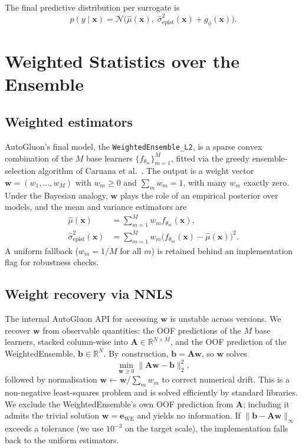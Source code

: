 \documentclass[conference]{IEEEtran}
\begin{document}
The final predictive distribution per surrogate is
\begin{equation}
p(y \mid \bm x) = \mathcal{N}\!\big(\hat\mu(\bm x),\; \hat\sigma^2_{\text{epist}}(\bm x) + g_\phi(\bm x)\big).
\label{eq:predictive-dist}
\end{equation}

\section{Weighted Statistics over the Ensemble}
\label{sec:weights}

\subsection{Weighted estimators}

AutoGluon's final model, the \texttt{WeightedEnsemble\_L2}, is a sparse convex combination of the $M$ base learners $\{f_{\theta_m}\}_{m=1}^M$, fitted via the greedy ensemble-selection algorithm of Caruana et al.~\cite{caruana2004}. The output is a weight vector $\bm w = (w_1, \ldots, w_M)$ with $w_m \geq 0$ and $\sum_m w_m = 1$, with many $w_m$ exactly zero. Under the Bayesian analogy, $\bm w$ plays the role of an empirical posterior over models, and the mean and variance estimators are
\begin{align}
\hat\mu(\bm x) &= \sum_{m=1}^M w_m f_{\theta_m}(\bm x), \label{eq:mu-hat}\\
\hat\sigma^2_{\text{epist}}(\bm x) &= \sum_{m=1}^M w_m \big(f_{\theta_m}(\bm x) - \hat\mu(\bm x)\big)^2. \label{eq:sigma-epist}
\end{align}
A uniform fallback ($w_m = 1/M$ for all $m$) is retained behind an implementation flag for robustness checks.

\subsection{Weight recovery via NNLS}

The internal AutoGluon API for accessing $\bm w$ is unstable across versions. We recover $\bm w$ from observable quantities: the OOF predictions of the $M$ base learners, stacked column-wise into $\mathbf{A} \in \mathbb{R}^{N \times M}$, and the OOF prediction of the WeightedEnsemble, $\bm b \in \mathbb{R}^N$. By construction, $\bm b = \mathbf{A}\bm w$, so $\bm w$ solves
\begin{equation}
\min_{\bm w \geq 0} \|\mathbf{A}\bm w - \bm b\|_2^2,
\label{eq:nnls}
\end{equation}
followed by normalisation $\bm w \leftarrow \bm w / \sum_m w_m$ to correct numerical drift. This is a non-negative least-squares problem and is solved efficiently by standard libraries. We exclude the WeightedEnsemble's own OOF prediction from $\mathbf{A}$; including it admits the trivial solution $\bm w = \bm{e}_{\text{WE}}$ and yields no information. If $\|\bm b - \mathbf{A}\bm w\|_\infty$ exceeds a tolerance (we use $10^{-3}$ on the target scale), the implementation falls back to the uniform estimators.
\end{document}
